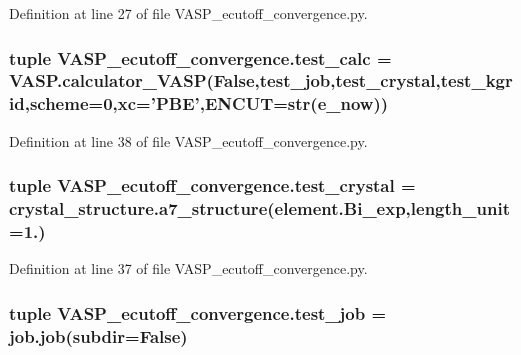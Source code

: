 Definition at line 27 of file V\+A\+S\+P\+\_\+ecutoff\+\_\+convergence.\+py.

\hypertarget{namespace_v_a_s_p__ecutoff__convergence_a0932f8fc31cc2292875f4747efdb6266}{
\subsubsection[{test\+\_\+calc}]{\setlength{\rightskip}{0pt plus 5cm}tuple V\+A\+S\+P\+\_\+ecutoff\+\_\+convergence.\+test\+\_\+calc = V\+A\+S\+P.\+calculator\+\_\+\+V\+A\+S\+P(False,{\bf test\+\_\+job},{\bf test\+\_\+crystal},{\bf test\+\_\+kgrid},scheme=0,xc='P\+B\+E',E\+N\+C\+U\+T=str({\bf e\+\_\+now}))}}\label{namespace_v_a_s_p__ecutoff__convergence_a0932f8fc31cc2292875f4747efdb6266}


Definition at line 38 of file V\+A\+S\+P\+\_\+ecutoff\+\_\+convergence.\+py.

\hypertarget{namespace_v_a_s_p__ecutoff__convergence_a92359c3b2568f133a889e58007978055}{
\subsubsection[{test\+\_\+crystal}]{\setlength{\rightskip}{0pt plus 5cm}tuple V\+A\+S\+P\+\_\+ecutoff\+\_\+convergence.\+test\+\_\+crystal = crystal\+\_\+structure.\+a7\+\_\+structure(element.\+Bi\+\_\+exp,length\+\_\+unit=1.)}}\label{namespace_v_a_s_p__ecutoff__convergence_a92359c3b2568f133a889e58007978055}


Definition at line 37 of file V\+A\+S\+P\+\_\+ecutoff\+\_\+convergence.\+py.

\hypertarget{namespace_v_a_s_p__ecutoff__convergence_a15e578365428bb2b848493c44550d026}{
\subsubsection[{test\+\_\+job}]{\setlength{\rightskip}{0pt plus 5cm}tuple V\+A\+S\+P\+\_\+ecutoff\+\_\+convergence.\+test\+\_\+job = job.\+job(subdir=False)}}\label{namespace_v_a_s_p__ecutoff__convergence_a15e578365428bb2b848493c44550d026}


